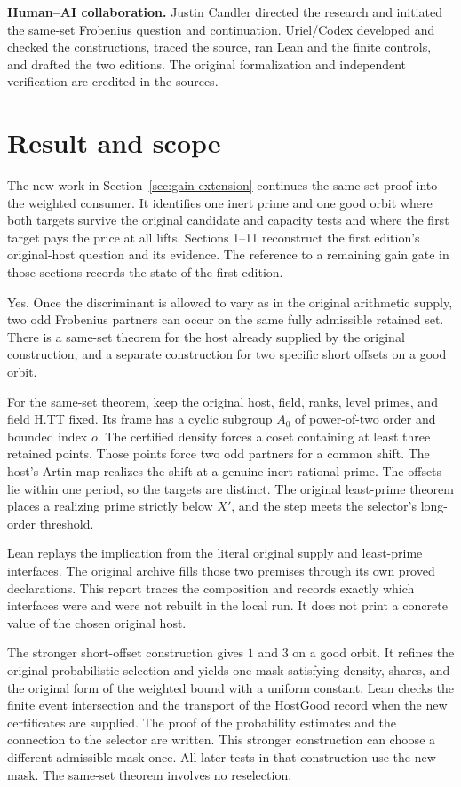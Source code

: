 \documentclass[12pt,letterpaper]{article}
\DeclareRobustCommand{\id}[1]{\mbox{\small\ttfamily #1}}
\begin{document}
\medskip
\textbf{Human--AI collaboration.} Justin Candler directed the research and initiated the same-set Frobenius question and continuation. Uriel/Codex developed and checked the constructions, traced the source, ran Lean and the finite controls, and drafted the two editions. The original formalization and independent verification are credited in the sources.
\clearpage
\begingroup\small\setlength{\parskip}{0pt}\tableofcontents\endgroup
\clearpage
{}
\section{Result and scope}
The new work in Section~\ref{sec:gain-extension} continues the same-set proof into the weighted consumer. It identifies one inert prime and one good orbit where both targets survive the original candidate and capacity tests and where the first target pays the price at all lifts. Sections 1--11 reconstruct the first edition's original-host question and its evidence. The reference to a remaining gain gate in those sections records the state of the first edition.
\label{sec:result}

Yes. Once the discriminant is allowed to vary as in the original arithmetic supply, two odd Frobenius partners can occur on the same fully admissible retained set. There is a same-set theorem for the host already supplied by the original construction, and a separate construction for two specific short offsets on a good orbit.

For the same-set theorem, keep the original host, field, ranks, level primes, and field \id{H.TT} fixed. Its frame has a cyclic subgroup \(A_0\) of power-of-two order and bounded index \(o\). The certified density forces a coset containing at least three retained points. Those points force two odd partners for a common shift. The host's Artin map realizes the shift at a genuine inert rational prime. The offsets lie within one period, so the targets are distinct. The original least-prime theorem places a realizing prime strictly below \(X'\), and the step meets the selector's long-order threshold.

Lean replays the implication from the literal original supply and least-prime interfaces. The original archive fills those two premises through its own proved declarations. This report traces the composition and records exactly which interfaces were and were not rebuilt in the local run. It does not print a concrete value of the chosen original host.

The stronger short-offset construction gives \(1\) and \(3\) on a good orbit. It refines the original probabilistic selection and yields one mask satisfying density, shares, and the original form of the weighted bound with a uniform constant. Lean checks the finite event intersection and the transport of the \id{HostGood} record when the new certificates are supplied. The proof of the probability estimates and the connection to the selector are written. This stronger construction can choose a different admissible mask once. All later tests in that construction use the new mask. The same-set theorem involves no reselection.
\end{document}
